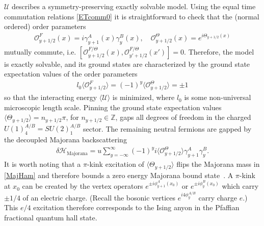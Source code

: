 $\mathcal{U}$ describes a symmetry-preserving exactly solvable model. Using the equal time commutation relations \eqref{ETcomm0} it is straightforward to check that the (normal ordered) order parameters \begin{align}\mathcal{O}_{y+1/2}^F(x)=i\gamma^A_{y+1}(x)\gamma^B_y(x),\quad\mathcal{O}_{y+1/2}^\Theta(x)=e^{i\Theta_{y+1/2}(x)}\label{orderparameters}\end{align} mutually commute, i.e. $\left[\mathcal{O}_{y+1/2}^{F/\Theta}(x),\mathcal{O}_{y'+1/2}^{F/\Theta}(x')\right]=0$. Therefore, the model is exactly solvable, and its ground states are characterized by the ground state expectation values of the order parameters \begin{align}l_0\langle\mathcal{O}_{y+1/2}^F\rangle=(-1)^y\langle\mathcal{O}_{y+1/2}^\Theta\rangle=\pm1\end{align} so that the interacting energy $\langle\mathcal{U}\rangle$ is minimized, where $l_0$ is some non-universal microscopic length scale. Pinning the ground state expectation values $\langle\Theta_{y+1/2}\rangle=n_{y+1/2}\pi$, for $n_{y+1/2}\in\mathbb{Z}$, gaps all degrees of freedom in the charged $U(1)_4^{A/B}=SU(2)_1^{A/B}$ sector. The remaining neutral fermions are gapped by the decoupled Majorana backscattering \begin{align}\delta\mathcal{H}_{\mathrm{Majorana}}=u\sum_{y=-\infty}^\infty(-1)^yi\langle\mathcal{O}^\Theta_{y+1/2}\rangle\gamma^A_{y+1}\gamma^B_y.\label{MajHam}\end{align} It is worth noting that a $\pi$-kink excitation of $\langle\Theta_{y+1/2}\rangle$ flips the Majorana mass in \eqref{MajHam} and therefore bounds a zero energy Majorana bound state~\cite{Kitaevchain}. A $\pi$-kink at $x_0$ can be created by the vertex operators $e^{\pm i\phi^A_{y+1}(x_0)}$ or $e^{\pm i\phi^B_y(x_0)}$ which carry $\pm1/4$ of an electric charge. (Recall the bosonic vertices $e^{i4\phi^{A/B}_y}$ carry charge $e$.) This $e/4$ excitation therefore corresponds to the Ising anyon in the Pfaffian fractional quantum hall state.

